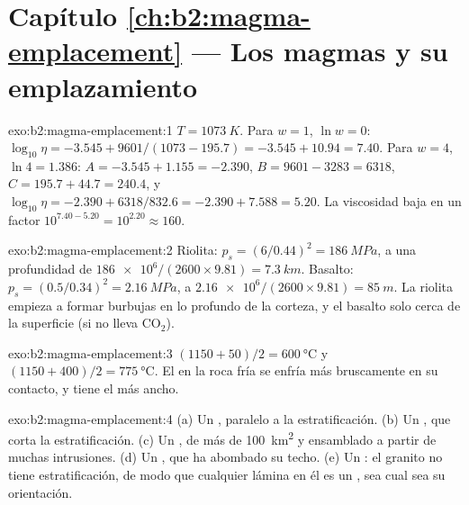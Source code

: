\section*{Capítulo \ref{ch:b2:magma-emplacement} --- Los magmas y su emplazamiento}

\begin{solution}{exo:b2:magma-emplacement:1}
$T = \qty{1073}{K}$. Para $w = 1$, $\ln w = 0$: $\log_{10}\eta = -3.545 +
9601/(1073 - 195.7) = -3.545 + 10.94 = 7.40$. Para $w = 4$, $\ln 4 = 1.386$:
$A = -3.545 + 1.155 = -2.390$, $B = 9601 - 3283 = 6318$, $C = 195.7 + 44.7 =
240.4$, y $\log_{10}\eta = -2.390 + 6318/832.6 = -2.390 + 7.588 = 5.20$. La
viscosidad baja en un factor $10^{7.40 - 5.20} = 10^{2.20} \approx 160$.
\end{solution}

\begin{solution}{exo:b2:magma-emplacement:2}
Riolita: $p_s = (6/0.44)^2 = \qty{186}{MPa}$, a una profundidad de $\num{186e6}/(2600\times9.81)
= \qty{7.3}{km}$. Basalto: $p_s = (0.5/0.34)^2 = \qty{2.16}{MPa}$, a
$\num{2.16e6}/(2600\times9.81) = \qty{85}{m}$. La riolita empieza a formar burbujas
en lo profundo de la corteza, y el basalto solo cerca de la superficie (si no lleva CO$_2$).
\end{solution}

\begin{solution}{exo:b2:magma-emplacement:3}
$(1150 + 50)/2 = \qty{600}{\celsius}$ y $(1150 + 400)/2 = \qty{775}{\celsius}$. El
 en la roca fría se enfría más bruscamente en su contacto, y tiene el  más ancho.
\end{solution}

\begin{solution}{exo:b2:magma-emplacement:4}
(a) Un , paralelo a la estratificación. (b) Un , que corta la estratificación.
(c) Un , de más de \qty{100}{km^2} y ensamblado a partir de muchas intrusiones.
(d) Un , que ha abombado su techo. (e) Un : el granito no tiene estratificación,
de modo que cualquier lámina en él es un , sea cual sea su orientación.
\end{solution}

